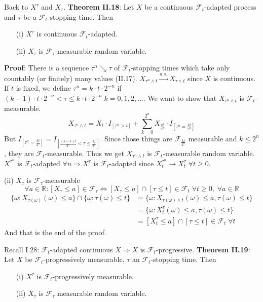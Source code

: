 \documentclass[english]{article}
\newcommand{\R}{\mathbb{R}}
\newcommand{\note}[1]{\noindent\textbf{#1}}
\newcommand{\F}{\mathcal F}
\newcommand{\as}[1]{\stackrel {a.s.}{#1}}
\begin{document}
Back to $X^\tau$ and $X_\tau$. \newline
\note{Theorem II.18}: Let $X$ be a continuous $\F_t$-adapted process and $\tau$ be a $\F_t$-stopping time. Then \begin{enumerate}
\item[(i)] $X^\tau$ is continuous $\F_t$-adapted.
\item[(ii)] $X_\tau$ is $\F_\tau$-measurable random variable. 
\end{enumerate}
\note{Proof}: There is a sequence $\tau^n \searrow \tau$ of $\F_t$-stopping times which take only countably (or finitely) many values (II.17). $X_{\tau^n\wedge t} \as \to X_{\tau\wedge t}$ since $X$ is continuous. If $t$ is fixed, we define $\tau^n  = k\cdot t\cdot  2^{-n}$ if $(k-1) \cdot t \cdot 2^{-n} < \tau \leq k\cdot t\cdot 2^{-n}\; k=0,1,2,\dots$. \newline
We want to show that $X_{\tau^n\wedge t}$ is $\F_t$-measurable.
$$X_{\tau^n\wedge t} = X_t \cdot I_{[\tau^n >t ]} + \sum_{k=0}^{2^n} X_{\frac {kt}{2^n}} \cdot I_{[\tau^n = \frac{kt}{2^n}]}$$
But $I_{[\tau^n = \frac{kt}{2^n}]} = I_{[\frac{(k-1)t}{2^n} <\tau \leq \frac {kt}{2^n}]}$. Since those things are $\F_{\frac{kt}{2^n}}$ measurable and $k \leq 2^n$, they are $\F_t$-measurable. Thus we get $X_{\tau^n \wedge t}$ is $\F_t$-measurable random variable. \newline
$X^{\tau^n}$ is $\F_t$-adapted $\forall n \Rightarrow X^\tau$ is $\F_t$-adapted since $X^{\tau^n}_t \to X^\tau_t \; \forall t \geq 0$. \newline

(ii) $X_\tau$ is $\F_\tau$-measurable \newline
$$\forall a \in \R: [X_\tau \leq a] \in \F_\tau \iff [X_\tau \leq a] \cap [\tau \leq t] \in \F_t \;\forall t \geq 0, \;\forall a\in \R$$
\begin{align*} \{\omega: X_{\tau(\omega)} (\omega) \leq a \} \cap \{\omega: \tau(\omega) \leq t\} & = \{\omega : X_{\tau(\omega) \wedge t} (\omega) \leq a, \tau(\omega) \leq t \} \\ &= \{\omega: X^\tau_t(\omega) \leq a, \tau(\omega) \leq t\}\\\ &= [X^\tau_t \leq a] \cap [\tau \leq t] \in \F_t \; \forall t \end{align*}
And that is the end of the proof. \newline

Recall I.28: $\F_t$-adapted continuous $X \Rightarrow X$ is $\F_t$-progressive. \newline
\note{Theorem II.19}: Let $X$ be $\F_t$-progressively measurable, $\tau$ an $\F_t$-stopping time. Then \begin{enumerate}
\item[(i)] $X^\tau$ is $\F_t$-progressively measurable.
\item[(ii)] $X_\tau$ is $\F_\tau$ measurable random variable.
\end{enumerate}
\end{document}
